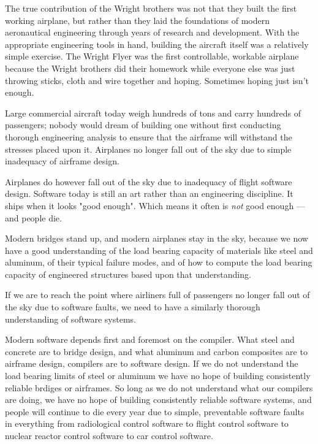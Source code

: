 The true contribution of the Wright brothers was not that they built 
the first working airplane, but rather than they laid the foundations 
of modern aeronautical engineering through years of research and 
development.  With the appropriate engineering tools in hand, building 
the aircraft itself was a relatively simple exercise.  The Wright Flyer 
was the first controllable, workable airplane because the Wright brothers 
did their homework while everyone else was just throwing sticks, cloth 
and wire together and hoping.  Sometimes hoping just isn't enough. 

Large commercial aircraft today weigh hundreds of tons and carry 
hundreds of passengers;  nobody would dream of building one without 
first conducting thorough engineering analysis to ensure that the 
airframe will withstand the stresses placed upon it.  Airplanes no 
longer fall out of the sky due to simple inadequacy of airframe 
design. 

Airplanes do however fall out of the sky due to inadequacy of 
flight software design.  Software today is still an art rather 
than an engineering discipline.  It ships when it looks "good 
enough".  Which means it often is {\it not} good enough --- and 
people die. 

Modern bridges stand up, and modern airplanes stay in the sky, 
because we now have a good understanding of the load bearing 
capacity of materials like steel and aluminum, of their typical 
failure modes, and of how to compute the load bearing capacity 
of engineered structures based upon that understanding. 

If we are to reach the point where airliners full of passengers 
no longer fall out of the sky due to software faults, we need to 
have a similarly thorough understanding of software systems. 

Modern software depends first and foremost on the compiler.  What 
steel and concrete are to bridge design, and what aluminum and 
carbon composites are to airframe design, compilers are to software 
design.  If we do not understand the load bearing limits of steel 
or aluminum we have no hope of building consistently reliable brdiges or airframes. 
So long as we do not understand what our compilers are doing, we have 
no hope of building consistently reliable software systems, and people 
will continue to die every year due to simple, preventable software 
faults in everything from radiological control software to flight 
control software to nuclear reactor control software to car control 
software. 

